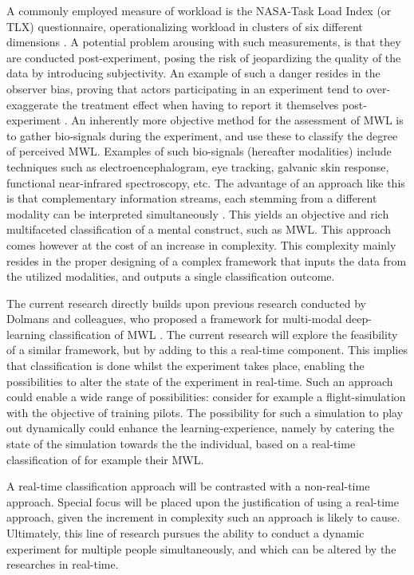 \documentclass{article}
\begin{document}
A commonly employed measure of workload is the NASA-Task Load Index (or TLX) questionnaire, operationalizing workload in clusters of six different dimensions \cite{hart2006nasa}. A potential problem arousing with such measurements, is that they are conducted post-experiment, posing the risk of jeopardizing the quality of the data by introducing subjectivity. An example of such a danger resides in the observer bias, proving that actors participating in an experiment tend to over-exaggerate the treatment effect when having to report it themselves post-experiment \cite{mahtani2018catalogue}. An inherently more objective method for the assessment of MWL is to gather bio-signals during the experiment, and use these to classify the degree of perceived MWL. Examples of such bio-signals (hereafter modalities) include techniques such as electroencephalogram, eye tracking, galvanic skin response, functional near-infrared spectroscopy, etc. The advantage of an approach like this is that complementary information streams, each stemming from a different modality can be interpreted simultaneously \cite{ramachandram2017deep}. This yields an objective and rich multifaceted classification of a mental construct, such as MWL. This approach comes however at the cost of an increase in complexity. This complexity mainly resides in the proper designing of a complex framework that inputs the data from the utilized modalities, and outputs a single classification outcome. 

The current research directly builds upon previous research conducted by Dolmans and colleagues, who proposed a framework for multi-modal deep-learning classification of MWL \cite{dolmans2020perceived}. The current research will explore the feasibility of a similar framework, but by adding to this a real-time component. This implies that classification is done whilst the experiment takes place, enabling the possibilities to alter the state of the experiment in real-time. Such an approach could enable a wide range of possibilities: consider for example a flight-simulation with the objective of training pilots. The possibility for such a simulation to play out dynamically could enhance the learning-experience, namely by catering the state of the simulation towards the the individual, based on a real-time classification of for example their MWL.

A real-time classification approach will be contrasted with a non-real-time approach. Special focus will be placed upon the justification of using a real-time approach, given the increment in complexity such an approach is likely to cause. Ultimately, this line of research pursues the ability to conduct a dynamic experiment for multiple people simultaneously, and which can be altered by the researches in real-time. 
\end{document}

